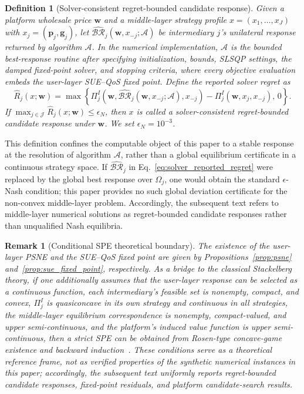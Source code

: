 \documentclass[11pt,a4paper]{article}
\newtheorem{remark}{Remark}
\newtheorem{definition}{Definition}
\newcommand{\J}{\mathcal{J}}
\newcommand{\w}{\boldsymbol{w}}
\newcommand{\p}{\boldsymbol{p}}
\newcommand{\g}{\boldsymbol{g}}
\begin{document}
\begin{definition}[Solver-consistent regret-bounded candidate response]
\label{def:solver_regret_candidate}
Given a platform wholesale price $\w$ and a middle-layer strategy profile $x=(x_1,\ldots,x_J)$ with $x_j=(\p_j,\g_j)$, let $\widehat{\mathcal{BR}}_j(\w,x_{-j};\mathcal{A})$ be intermediary $j$'s unilateral response returned by algorithm $\mathcal{A}$. In the numerical implementation, $\mathcal{A}$ is the bounded best-response routine after specifying initialization, bounds, SLSQP settings, the damped fixed-point solver, and stopping criteria, where every objective evaluation embeds the user-layer SUE--QoS fixed point. Define the reported solver regret as
\begin{equation}
  \widehat R_j(x;\w)=
  \max\left\{
  \Pi^I_j(\w,\widehat{\mathcal{BR}}_j(\w,x_{-j};\mathcal{A}),x_{-j})
  -\Pi^I_j(\w,x_j,x_{-j}),\,0
  \right\}.
  \label{eq:solver_reported_regret}
\end{equation}
If $\max_{j\in\J}\widehat R_j(x;\w)\le \epsilon_N$, then $x$ is called a solver-consistent regret-bounded candidate response under $\w$. We set $\epsilon_N=10^{-3}$.
\end{definition}

This definition confines the computable object of this paper to a stable response at the resolution of algorithm $\mathcal{A}$, rather than a global equilibrium certificate in a continuous strategy space. If $\widehat{\mathcal{BR}}_j$ in Eq.~\eqref{eq:solver_reported_regret} were replaced by the global best response over $\Omega_j$, one would obtain the standard $\epsilon$-Nash condition; this paper provides no such global deviation certificate for the non-convex middle-layer problem. Accordingly, the subsequent text refers to middle-layer numerical solutions as regret-bounded candidate responses rather than unqualified Nash equilibria.

\begin{remark}[Conditional SPE theoretical boundary]
\label{rem:conditional_spe_boundary}
The existence of the user-layer PSNE and the SUE--QoS fixed point are given by Propositions~\ref{prop:psne} and~\ref{prop:sue_fixed_point}, respectively. As a bridge to the classical Stackelberg theory, if one additionally assumes that the user-layer response can be selected as a continuous function, each intermediary's feasible set is nonempty, compact, and convex, $\Pi^I_j$ is quasiconcave in its own strategy and continuous in all strategies, the middle-layer equilibrium correspondence is nonempty, compact-valued, and upper semi-continuous, and the platform's induced value function is upper semi-continuous, then a strict SPE can be obtained from Rosen-type concave-game existence and backward induction~\cite{rosen1965existence,selten1965spieltheoretische,fudenberg1991game}. These conditions serve as a theoretical reference frame, not as verified properties of the synthetic numerical instances in this paper; accordingly, the subsequent text uniformly reports regret-bounded candidate responses, fixed-point residuals, and platform candidate-search results.
\end{remark}
\end{document}
